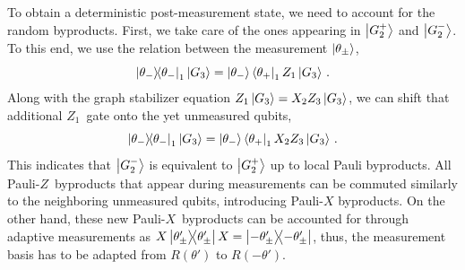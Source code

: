\documentclass[../main.tex]{subfiles}
\begin{document}
To obtain a deterministic post-measurement state, we need to account for the random byproducts. First, we take care of the ones appearing in $\ket{G^+_2}$ and $\ket{G^-_2}$. To this end, we use the relation between the measurement $\ket{\theta_{\pm}}$,
\begin{equation}
    \ketbra{\theta_-}_1 \ket{G_3} = \ket{\theta_-}\bra{\theta_+}_1 Z_1 \ket{G_3} \, .
\end{equation} 
Along with the graph stabilizer equation $Z_1\ket{G_3} = X_2 Z_3 \ket{G_3}$, we can shift that additional $Z_1$~gate onto the yet unmeasured qubits,
\begin{equation}
    \ketbra{\theta_-}_1 \ket{G_3} = \ket{\theta_-}\bra{\theta_+}_1 X_2 Z_3 \ket{G_3} \, .
\end{equation} 
This indicates that $\ket{G^-_2}$ is equivalent to $\ket{G^+_2}$ up to local Pauli byproducts. All Pauli-$Z$~byproducts that appear during measurements can be commuted similarly to the neighboring unmeasured qubits, introducing Pauli-$X$ byproducts. On the other hand, these new Pauli-$X$~byproducts can be accounted for through adaptive measurements as  $X \ketbra{\theta'_\pm}X=\ketbra{-\theta'_\pm} $,
thus, the measurement basis has to be adapted from $R(\theta')$ to $R(-\theta')$.
\end{document}
